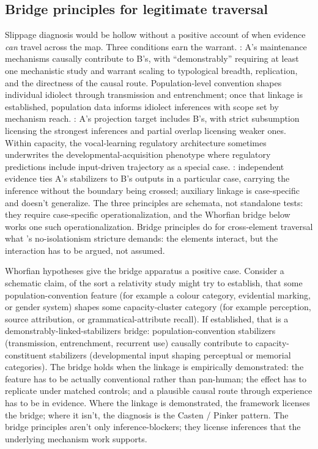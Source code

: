 \documentclass[12pt]{article}
\begin{document}
\subsection{Bridge principles for legitimate traversal}\label{sec:slippage-bridges}

Slippage diagnosis would be hollow without a positive account of when evidence \emph{can} travel across the map. Three conditions earn the warrant. : A's maintenance mechanisms causally contribute to B's, with \enquote{demonstrably} requiring at least one mechanistic study and warrant scaling to typological breadth, replication, and the directness of the causal route. Population-level convention shapes individual idiolect through transmission and entrenchment; once that linkage is established, population data informs idiolect inferences with scope set by mechanism reach. : A's projection target includes B's, with strict subsumption licensing the strongest inferences and partial overlap licensing weaker ones. Within capacity, the vocal-learning regulatory architecture sometimes underwrites the developmental-acquisition phenotype where regulatory predictions include input-driven trajectory as a special case. : independent evidence ties A's stabilizers to B's outputs in a particular case, carrying the inference without the boundary being crossed; auxiliary linkage is case-specific and doesn't generalize. The three principles are schemata, not standalone tests: they require case-specific operationalization, and the Whorfian bridge below works one such operationalization. Bridge principles do for cross-element traversal what \citeauthor{santana2016language}'s no-isolationism stricture demands: the elements interact, but the interaction has to be argued, not assumed.

Whorfian hypotheses give the bridge apparatus a positive case. Consider a schematic claim, of the sort a relativity study might try to establish, that some population-convention feature (for example a colour category, evidential marking, or gender system) shapes some capacity-cluster category (for example perception, source attribution, or grammatical-attribute recall). If established, that is a demonstrably-linked-stabilizers bridge: population-convention stabilizers (transmission, entrenchment, recurrent use) causally contribute to capacity-constituent stabilizers (developmental input shaping perceptual or memorial categories). The bridge holds when the linkage is empirically demonstrated: the feature has to be actually conventional rather than pan-human; the effect has to replicate under matched controls; and a plausible causal route through experience has to be in evidence. Where the linkage is demonstrated, the framework licenses the bridge; where it isn't, the diagnosis is the Casten / Pinker pattern. The bridge principles aren't only inference-blockers; they license inferences that the underlying mechanism work supports.
\end{document}
